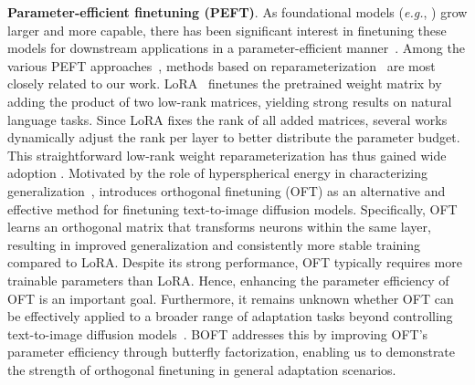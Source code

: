 \textbf{Parameter-efficient finetuning (PEFT)}. As foundational models (\emph{e.g.}, \cite{brown2020language,radford2021learning,rombach2022high,kirillov2023segment}) grow larger and more capable, there has been significant interest in finetuning these models for downstream applications in a parameter-efficient manner~\cite{treviso2023efficient,ding2023parameter,lialin2023scaling}. Among the various PEFT approaches~\cite{houlsby2019parameter,aghajanyan2020intrinsic,hulora2022,edalati2022krona,wang2022adamix,gheini2021cross,zaken2022bitfit,guo2020parameter,sung2021training,ansell2022composable,lester2021power,li2021prefix,vu2022spot,he2021towards,mao2021unipelt,karimi2021compacter,liu2022few,sung2022lst,chen2022parameter,jia2022visual,chen2022adaptformer,zhang2022neural,jie2023fact,lian2022scaling,luo2023towards}, methods based on reparameterization~\cite{aghajanyan2020intrinsic,hulora2022,edalati2022krona} are most closely related to our work. LoRA~\cite{hulora2022} finetunes the pretrained weight matrix by adding the product of two low-rank matrices, yielding strong results on natural language tasks. Since LoRA fixes the rank of all added matrices, several works \cite{zhang2022adaptive,valipour2022dylora,zhang2023increlora} dynamically adjust the rank per layer to better distribute the parameter budget. This straightforward low-rank weight reparameterization has thus gained wide adoption \cite{dettmers2023qlora,zi2023delta,chavan2023one}. Motivated by the role of hyperspherical energy in characterizing generalization~\cite{liu2018learning,liu2021orthogonal}, \cite{qiu2023controlling} introduces orthogonal finetuning (OFT) as an alternative and effective method for finetuning text-to-image diffusion models. Specifically, OFT learns an orthogonal matrix that transforms neurons within the same layer, resulting in improved generalization and consistently more stable training compared to LoRA. Despite its strong performance, OFT typically requires more trainable parameters than LoRA. Hence, enhancing the parameter efficiency of OFT is an important goal. Furthermore, it remains unknown whether OFT can be effectively applied to a broader range of adaptation tasks beyond controlling text-to-image diffusion models~\cite{qiu2023controlling}. BOFT addresses this by improving OFT’s parameter efficiency through butterfly factorization, enabling us to demonstrate the strength of orthogonal finetuning in general adaptation scenarios.

